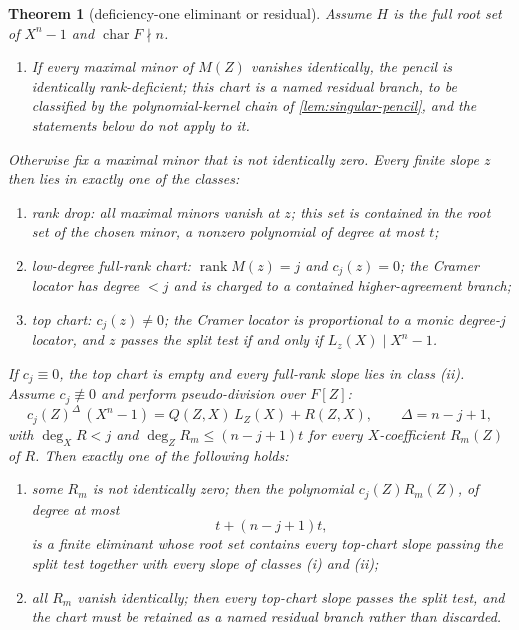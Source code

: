 \documentclass[11pt]{article}
\newtheorem{theorem}{Theorem}[section]
\theoremstyle{definition}
\theoremstyle{remark}
\begin{document}
\begin{theorem}[deficiency-one eliminant or residual]\label{thm:capf-spi}
Assume $H$ is the full root set of $X^n-1$ and $\operatorname{char}F\nmid n$.
\begin{enumerate}[label=\textup{(\arabic*)},start=0]
\item If every maximal minor of $M(Z)$ vanishes identically, the pencil is identically rank-deficient; this chart is a named residual branch, to be classified by the polynomial-kernel chain of \cref{lem:singular-pencil}, and the statements below do not apply to it.
\end{enumerate}
Otherwise fix a maximal minor that is not identically zero.  Every finite slope $z$ then lies in exactly one of the classes:
\begin{enumerate}[label=\textup{(\roman*)}]
\item rank drop: all maximal minors vanish at $z$; this set is contained in the root set of the chosen minor, a nonzero polynomial of degree at most $t$;
\item low-degree full-rank chart: $\operatorname{rank}M(z)=j$ and $c_j(z)=0$; the Cramer locator has degree $<j$ and is charged to a contained higher-agreement branch;
\item top chart: $c_j(z)\ne0$; the Cramer locator is proportional to a monic degree-$j$ locator, and $z$ passes the split test if and only if $L_z(X)\mid X^n-1$.
\end{enumerate}
If $c_j\equiv0$, the top chart is empty and every full-rank slope lies in class \textup{(ii)}.  Assume $c_j\not\equiv0$ and perform pseudo-division over $F[Z]$:
\[
        c_j(Z)^\Delta\,(X^n-1)=Q(Z,X)\,L_Z(X)+R(Z,X),
        \qquad
        \Delta=n-j+1,
\]
with $\deg_XR<j$ and $\deg_ZR_m\le(n-j+1)t$ for every $X$-coefficient $R_m(Z)$ of $R$.  Then exactly one of the following holds:
\begin{enumerate}[label=\textup{(\alph*)}]
\item some $R_m$ is not identically zero; then the polynomial $c_j(Z)R_m(Z)$, of degree at most
\[
        t+(n-j+1)t,
\]
is a finite eliminant whose root set contains every top-chart slope passing the split test together with every slope of classes \textup{(i)} and \textup{(ii)};
\item all $R_m$ vanish identically; then every top-chart slope passes the split test, and the chart must be retained as a named residual branch rather than discarded.
\end{enumerate}
\end{theorem}
\end{document}
